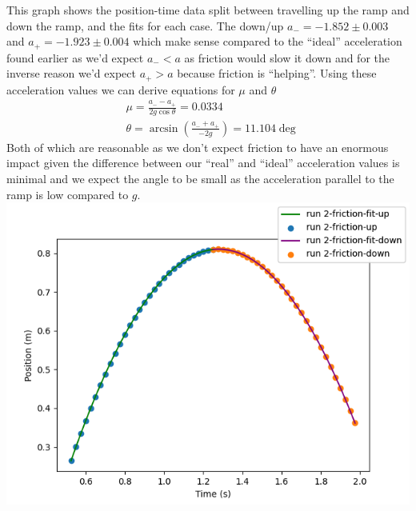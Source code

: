\documentclass[10pt]{article}
\theoremstyle{definition}
\begin{document}
This graph shows the position-time data split between travelling up the ramp and down the ramp, and the fits for each case.
The down/up $a_-=-1.852\pm0.003$ and $a_+=-1.923\pm0.004$ which make sense compared to the ``ideal''
acceleration found earlier as we'd expect $a_-<a$ as friction would slow it down and for the inverse reason we'd 
expect $a_+>a$ because friction is ``helping''. Using these acceleration values we can derive equations for $\mu$ and $\theta$
\begin{align*}
  & \mu=\displaystyle\frac{a_--a_+}{2g\cos\theta}=0.0334\\
  & \theta=\displaystyle\arcsin(\frac{a_-+a_+}{-2g})=11.104\deg 
\end{align*}
Both of which are reasonable as we don't expect friction to have an enormous impact given the difference between our ``real'' and ``ideal''
acceleration values is minimal and we expect the angle to be small as the acceleration parallel to the ramp is low compared to $g$.
\\
\includegraphics{Figure_3.png}\\
\end{document}
